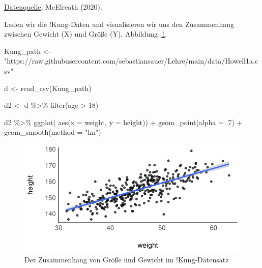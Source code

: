 \documentclass[
  a4paper,
  DIV=11]{scrreprt}
\newenvironment{Shaded}{\begin{snugshade}}{\end{snugshade}}
\newcommand{\AttributeTok}[1]{\textcolor[rgb]{0.40,0.45,0.13}{#1}}
\newcommand{\DecValTok}[1]{\textcolor[rgb]{0.68,0.00,0.00}{#1}}
\newcommand{\FunctionTok}[1]{\textcolor[rgb]{0.28,0.35,0.67}{#1}}
\newcommand{\NormalTok}[1]{\textcolor[rgb]{0.00,0.23,0.31}{#1}}
\newcommand{\OtherTok}[1]{\textcolor[rgb]{0.00,0.23,0.31}{#1}}
\newcommand{\SpecialCharTok}[1]{\textcolor[rgb]{0.37,0.37,0.37}{#1}}
\newcommand{\StringTok}[1]{\textcolor[rgb]{0.13,0.47,0.30}{#1}}
\theoremstyle{definition}
\theoremstyle{remark}
\begin{document}
\href{https://raw.githubusercontent.com/sebastiansauer/Lehre/main/data/Howell1a.csv}{Datenquelle},
McElreath (2020).

Laden wir die !Kung-Daten und visualisieren wir uns den Zusammenhang
zwischen Gewicht (X) und Größe (Y), Abbildung~\ref{fig-kung-zshg}.

\begin{Shaded}
\begin{Highlighting}[]
\NormalTok{Kung\_path }\OtherTok{\textless{}{-}} \StringTok{"https://raw.githubusercontent.com/sebastiansauer/Lehre/main/data/Howell1a.csv"}

\NormalTok{d }\OtherTok{\textless{}{-}} \FunctionTok{read\_csv}\NormalTok{(Kung\_path)  }

\NormalTok{d2 }\OtherTok{\textless{}{-}} 
\NormalTok{  d }\SpecialCharTok{\%\textgreater{}\%} 
  \FunctionTok{filter}\NormalTok{(age }\SpecialCharTok{\textgreater{}} \DecValTok{18}\NormalTok{) }

\NormalTok{d2 }\SpecialCharTok{\%\textgreater{}\%} 
  \FunctionTok{ggplot}\NormalTok{(}
       \FunctionTok{aes}\NormalTok{(}\AttributeTok{x =}\NormalTok{ weight, }\AttributeTok{y =}\NormalTok{ height)) }\SpecialCharTok{+}
  \FunctionTok{geom\_point}\NormalTok{(}\AttributeTok{alpha =}\NormalTok{ .}\DecValTok{7}\NormalTok{) }\SpecialCharTok{+}
  \FunctionTok{geom\_smooth}\NormalTok{(}\AttributeTok{method =} \StringTok{"lm"}\NormalTok{)}
\end{Highlighting}
\end{Shaded}

\begin{figure}[H]

{\centering \includegraphics{./lineare-modelle_files/figure-pdf/fig-kung-zshg-1.pdf}

}

\caption{\label{fig-kung-zshg}Der Zusammenhang von Größe und Gewicht im
!Kung-Datensatz}

\end{figure}
\end{document}

